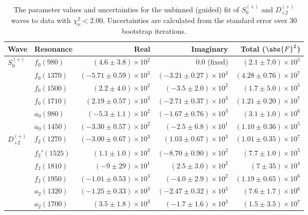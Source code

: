 \begin{table}[h]
    \begin{center}
        \begin{tabular}{llrrr}\toprule
        Wave & Resonance & Real & Imaginary & Total ($\abs{F}^2$) \\\midrule
$S_{0}^{(+)}$ & $f_{0}(980)$ & $(4.6 \pm 3.8) \times 10^{2}$ & $0.0$ (fixed) & $(2.1 \pm 7.0) \times 10^{5}$ \\
 & $f_{0}(1370)$ & $(-5.71 \pm 0.59) \times 10^{3}$ & $(-3.21 \pm 0.27) \times 10^{3}$ & $(4.28 \pm 0.76) \times 10^{7}$ \\
 & $f_{0}(1500)$ & $(2.2 \pm 4.0) \times 10^{2}$ & $(-3.5 \pm 2.0) \times 10^{2}$ & $(1.7 \pm 5.0) \times 10^{5}$ \\
 & $f_{0}(1710)$ & $(2.19 \pm 0.57) \times 10^{3}$ & $(-2.71 \pm 0.37) \times 10^{3}$ & $(1.21 \pm 0.20) \times 10^{7}$ \\
 & $a_{0}(980)$ & $(-5.3 \pm 1.1) \times 10^{2}$ & $(-1.67 \pm 0.76) \times 10^{3}$ & $(3.1 \pm 1.0) \times 10^{6}$ \\
 & $a_{0}(1450)$ & $(-3.30 \pm 0.57) \times 10^{2}$ & $(-2.5 \pm 6.8) \times 10^{1}$ & $(1.10 \pm 0.36) \times 10^{5}$ \\
$D_{+2}^{(+)}$ & $f_{2}(1270)$ & $(-3.00 \pm 0.67) \times 10^{3}$ & $(1.03 \pm 0.67) \times 10^{3}$ & $(1.01 \pm 0.35) \times 10^{7}$ \\
 & $f_{2}'(1525)$ & $(1.1 \pm 1.0) \times 10^{2}$ & $(-8.70 \pm 0.90) \times 10^{2}$ & $(7.7 \pm 1.0) \times 10^{5}$ \\
 & $f_{2}(1810)$ & $(-9 \pm 29) \times 10^{1}$ & $(2.5 \pm 3.0) \times 10^{2}$ & $(7 \pm 35) \times 10^{4}$ \\
 & $f_{2}(1950)$ & $(-1.01 \pm 0.53) \times 10^{3}$ & $(-4.0 \pm 2.9) \times 10^{2}$ & $(1.19 \pm 0.65) \times 10^{6}$ \\
 & $a_{2}(1320)$ & $(-1.25 \pm 0.33) \times 10^{3}$ & $(-2.47 \pm 0.32) \times 10^{3}$ & $(7.6 \pm 1.7) \times 10^{6}$ \\
 & $a_{2}(1700)$ & $(3.5 \pm 1.8) \times 10^{3}$ & $(-1.7 \pm 1.6) \times 10^{3}$ & $(1.5 \pm 3.5) \times 10^{7}$ \\\bottomrule
        \end{tabular}
    \caption{The parameter values and uncertainties for the unbinned (guided) fit of $S_{0}^{(+)}$ and $D_{+2}^{(+)}$ waves to data with $\chi^2_\nu < 2.00$. Uncertainties are calculated from the standard error over $30$ bootstrap iterations.}\label{tab:unbinned-fit-chisqdof-2.0-guided-Sp0p-Dp2p}
    \end{center}
\end{table}
